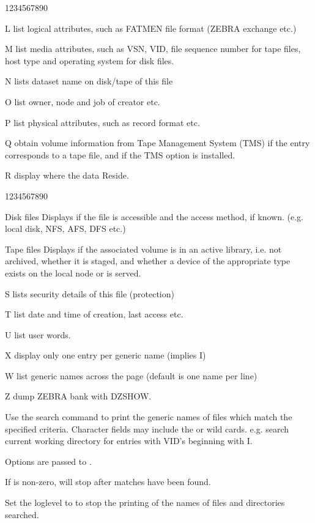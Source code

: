 \begin{DLtt}{1234567890}
\begin{DLtt}{12}
\item[L]list logical attributes, such as FATMEN file format
(ZEBRA exchange etc.)
\item[M]list media attributes, such as VSN, VID, file sequence number for tape
files, host type and operating system for disk files.
\item[N]lists dataset name on disk/tape of this file
\item[O]list owner, node and job of creator etc.
\item[P]list physical attributes, such as record format etc.
\item[Q]obtain volume information from Tape Management System (TMS)
if the entry corresponds to a tape file, and if the TMS
option is installed.
\item[R]display where the data Reside. 
\begin{DLtt}{1234567890}
\item[Disk files]Displays if the file is accessible and the access method, if
known. (e.g. local disk, NFS, AFS, DFS etc.)
\item[Tape files]Displays if the associated volume is in an active library,
i.e. not archived, whether it is staged, and whether a device of the appropriate
type exists on the local node or is served.
\end{DLtt}
\item[S]lists security details of this file (protection)
\item[T]list date and time of creation, last access etc.
\item[U]list user words.
\item[X]display only one entry per generic name (implies I)
\item[W]list generic names across the page (default is one name per line)
\item[Z]dump ZEBRA bank with DZSHOW.
\end{DLtt}
\end{DLtt}
Use the search command to print the generic names of files which
match the specified criteria. Character fields may include the
\Lit{*} or \Lit{\%} wild cards.
e.g.  search current working directory for entries
\Lit{\#} with VID's beginning with I.

Options are passed to .

If  is non-zero,  will stop after 
 matches have been found.

Set the loglevel to  to stop the printing of the names of
files and directories searched.

